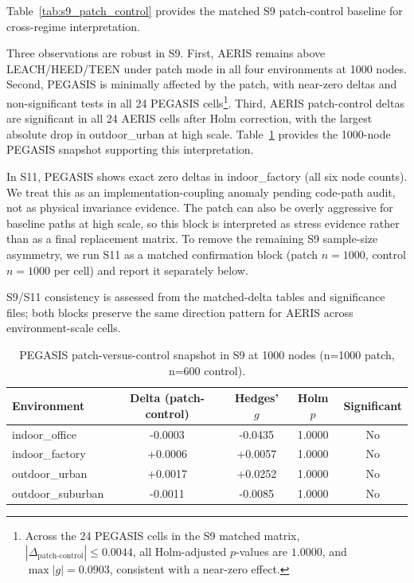 ﻿\documentclass[sensors,article,submit,moreauthors,pdftex]{Definitions/mdpi}
\begin{document}
Table~\ref{tab:s9_patch_control} provides the matched S9 patch-control baseline for cross-regime interpretation.

Three observations are robust in S9. First, AERIS remains above LEACH/HEED/TEEN under patch mode in all four environments at 1000 nodes. Second, PEGASIS is minimally affected by the patch, with near-zero deltas and non-significant tests in all 24 PEGASIS cells\footnote{Across the 24 PEGASIS cells in the S9 matched matrix, \(|\Delta_{\text{patch-control}}| \le 0.0044\), all Holm-adjusted \(p\)-values are \(1.0000\), and \(\max |g| = 0.0903\), consistent with a near-zero effect.}. Third, AERIS patch-control deltas are significant in all 24 AERIS cells after Holm correction, with the largest absolute drop in outdoor\_urban at high scale. Table~\ref{tab:s9_pegasis_1000} provides the 1000-node PEGASIS snapshot supporting this interpretation.

In S11, PEGASIS shows exact zero deltas in indoor\_factory (all six node counts). We treat this as an implementation-coupling anomaly pending code-path audit, not as physical invariance evidence. The patch can also be overly aggressive for baseline paths at high scale, so this block is interpreted as stress evidence rather than as a final replacement matrix. To remove the remaining S9 sample-size asymmetry, we run S11 as a matched confirmation block (patch \(n=1000\), control \(n=1000\) per cell) and report it separately below.

S9/S11 consistency is assessed from the matched-delta tables and significance files; both blocks preserve the same direction pattern for AERIS across environment-scale cells.

\begin{table}[H]
\caption{PEGASIS patch-versus-control snapshot in S9 at 1000 nodes (n=1000 patch, n=600 control).}
\label{tab:s9_pegasis_1000}
\centering
\begin{tabular}{lcccc}
\toprule
Environment & Delta (patch-control) & Hedges' $g$ & Holm $p$ & Significant \\
\midrule
indoor\_office    & -0.0003 & -0.0435 & 1.0000 & No \\
indoor\_factory   & +0.0006 & +0.0057 & 1.0000 & No \\
outdoor\_urban    & +0.0017 & +0.0252 & 1.0000 & No \\
outdoor\_suburban & -0.0011 & -0.0085 & 1.0000 & No \\
\bottomrule
\end{tabular}
\end{table}
\end{document}
